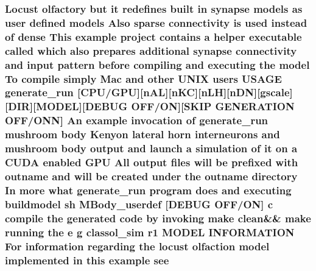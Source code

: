 \hypertarget{userproject_2MBody__userdef__project_2README_8txt_abf32849f9c3ee45276ee0d4aa4c07e0b}{
\subsubsection[{see}]{\setlength{\rightskip}{0pt plus 5cm}Locust olfactory but {\bf it} redefines built {\bf in} synapse models as user defined models Also sparse connectivity {\bf is} used instead of dense This example {\bf project} contains a helper executable called which also prepares additional synapse connectivity and input pattern before compiling and executing the {\bf model} To compile simply Mac and other U\+N\+I\+X users U\+S\+A\+G\+E {\bf generate\+\_\+run} \mbox{[}{\bf C\+P\+U}/{\bf G\+P\+U}\mbox{]}\mbox{[}n\+A\+L\mbox{]}\mbox{[}n\+K\+C\mbox{]}\mbox{[}n\+L\+H\mbox{]}\mbox{[}n\+D\+N\mbox{]}\mbox{[}gscale\mbox{]}\mbox{[}D\+I\+R\mbox{]}\mbox{[}M\+O\+D\+E\+L\mbox{]}\mbox{[}D\+E\+B\+U\+G O\+F\+F/O\+N\mbox{]}\mbox{[}S\+K\+I\+P G\+E\+N\+E\+R\+A\+T\+I\+O\+N O\+F\+F/O\+N\+N\mbox{]} An example invocation of {\bf generate\+\_\+run} mushroom body Kenyon lateral horn {\bf interneurons} and mushroom body output and launch a simulation of {\bf it} on a C\+U\+D\+A enabled {\bf G\+P\+U} All output files will be prefixed {\bf with} outname and will be created under the outname {\bf directory} In more what {\bf generate\+\_\+run} program does and executing buildmodel sh M\+Body\+\_\+userdef \mbox{[}D\+E\+B\+U\+G O\+F\+F/O\+N\mbox{]} c compile the generated {\bf code} by invoking make clean\&\& make running the e g classol\+\_\+sim r1 M\+O\+D\+E\+L I\+N\+F\+O\+R\+M\+A\+T\+I\+O\+N For information regarding the locust olfaction {\bf model} implemented {\bf in} this example see}}\label{userproject_2MBody__userdef__project_2README_8txt_abf32849f9c3ee45276ee0d4aa4c07e0b}
